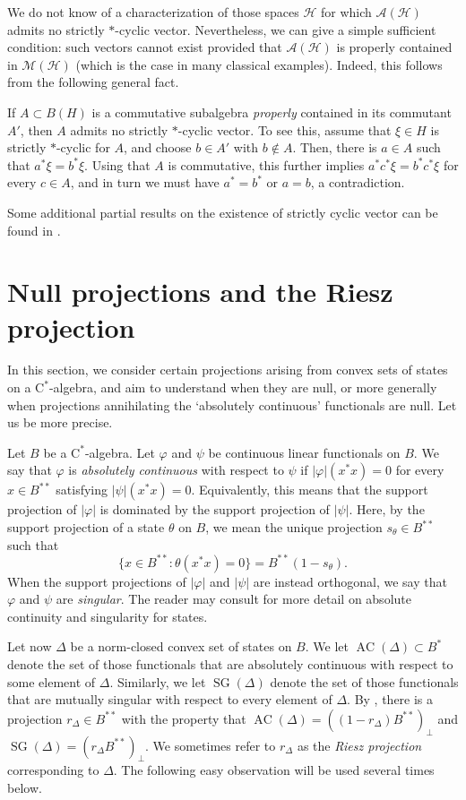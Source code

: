 \documentclass[10pt]{amsart}
\newcommand{\A}{{\mathcal{A}}}
\renewcommand{\H}{{\mathcal{H}}}
\newcommand{\M}{{\mathcal{M}}}
\newcommand{\rC}{\mathrm{C}}
\renewcommand{\phi}{\varphi}
\newcommand{\AC}{\operatorname{AC}}
\newcommand{\SG}{\operatorname{SG}}
\theoremstyle{definition}
\begin{document}
We do not know of a characterization of those spaces $\H$ for which $\A(\H)$ admits no strictly $*$-cyclic vector. Nevertheless, we can give a simple sufficient condition: such vectors cannot exist provided that $\A(\H)$ is properly contained in $\M(\H)$ (which is the case in many classical examples). %
Indeed, this follows from the following general fact. 

If $A\subset B(H)$ is a commutative subalgebra \emph{properly} contained in its commutant $A'$, then $A$ admits no strictly $*$-cyclic vector. To see this, assume that $\xi\in H$ is strictly $*$-cyclic for $A$, and choose $b\in A'$ with $b\notin A$. Then, there is $a\in A$ such that $a^*\xi=b^*\xi$. Using that $A$ is commutative, this further implies $a^*c^*\xi=b^* c^*\xi$ for every $c\in A$, and in turn we must have $a^*=b^*$ or $a=b$, a contradiction. 

Some additional partial results on the existence of strictly cyclic vector can be found in \cite{shields1974}.



\section{Null projections and the  Riesz projection}\label{S:riesznull}
In this section, we consider certain projections arising from convex sets of states on a $\rC^*$-algebra, and aim to understand when they are null,
 or more generally when projections annihilating the `absolutely continuous’ functionals are null.  Let us be more precise.

Let $B$ be a 
 $\rC^*$-algebra. Let $\phi$ and $\psi$ be continuous linear functionals on $B$. We say that $\phi$ is \emph{absolutely continuous} with respect to $\psi$ if $|\phi|(x^*x)=0$ for every $x\in B^{**}$ satisfying $|\psi|(x^*x)=0$. Equivalently, this means that the support projection of $|\phi|$ is dominated by the support projection of $|\psi|$. Here, by the support projection of a state $\theta$ on $B$, we mean the unique projection $s_\theta\in B^{**}$ such that
\[
\{x\in B^{**}:\theta(x^*x)=0\}=B^{**}(1-s_\theta).
\]
When the support projections of $|\phi|$ and $|\psi|$ are instead orthogonal, we say that $\phi$ and $\psi$ are \emph{singular}. The reader may consult \cite[Section 2]{CT2023Henkin} for more detail on absolute continuity and singularity  for states.

Let now $\Delta$ be a norm-closed convex set of states on $B$.  We let $\AC(\Delta)\subset B^*$ denote the set of those functionals that are absolutely continuous with respect to some element of $\Delta$. Similarly, we let $\SG(\Delta)$ denote the set of those functionals that are mutually singular with respect to every element of $\Delta$.   By \cite[Theorem 3.5]{CT2023Henkin}, there is a projection $r_\Delta\in B^{**}$ with the property that $\AC(\Delta)=((1-r_\Delta)B^{**})_\perp$ and $\SG(\Delta)=(r_\Delta B^{**})_\perp$. We sometimes refer to $r_\Delta$ as the \emph{Riesz projection} corresponding to $\Delta$. The following easy observation will be used several times below.
\end{document}
